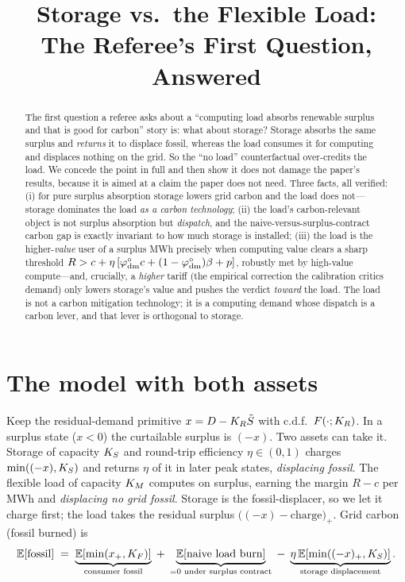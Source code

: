 \title[Storage competes for the same surplus]{Storage vs.\ the Flexible Load:\\
The Referee's First Question, Answered}


\begin{abstract}
The first question a referee asks about a ``computing load absorbs renewable surplus and that
is good for carbon'' story is: what about storage? Storage absorbs the same surplus and
\emph{returns} it to displace fossil, whereas the load consumes it for computing and displaces
nothing on the grid. So the ``no load'' counterfactual over-credits the load. We concede the
point in full and then show it does not damage the paper's results, because it is aimed at a
claim the paper does not need. Three facts, all verified: (i) for pure surplus absorption
storage lowers grid carbon and the load does not---storage dominates the load \emph{as a
carbon technology}; (ii) the load's carbon-relevant object is not surplus absorption but
\emph{dispatch}, and the naive-versus-surplus-contract carbon gap is exactly invariant to how
much storage is installed; (iii) the load is the higher-\emph{value} user of a surplus MWh
precisely when computing value clears a sharp threshold $R>c+\eta\,[\varphi^{\circ}_{\mathrm{dm}}c+(1-\varphi^{\circ}_{\mathrm{dm}})\beta+p]$,
robustly met by high-value compute---and, crucially, a \emph{higher} tariff (the empirical
correction the calibration critics demand) only lowers storage's value and pushes the verdict
\emph{toward} the load. The load is not a carbon mitigation technology; it is a computing
demand whose dispatch is a carbon lever, and that lever is orthogonal to storage.
\end{abstract}


\section{The model with both assets}
Keep the residual-demand primitive $x=D-K_R\tilde S$ with c.d.f.\ $F(\cdot;K_R)$. In a surplus
state ($x<0$) the curtailable surplus is $(-x)$. Two assets can take it. Storage of capacity
$K_S$ and round-trip efficiency $\eta\in(0,1)$ charges $\min((-x),K_S)$ and returns $\eta$ of
it in later peak states, \emph{displacing fossil}. The flexible load of capacity $K_M$
computes on surplus, earning the margin $R-c$ per MWh and \emph{displacing no grid fossil}.
Storage is the fossil-displacer, so we let it charge first; the load takes the residual
surplus $\big((-x)-\text{charge}\big)_+$. Grid carbon (fossil burned) is
\begin{equation}\label{st-eq:carbon}
  \mathbb{E}[\text{fossil}] \;=\; \underbrace{\mathbb{E}[\min(x_+,K_F)]}_{\text{consumer fossil}}
  \;+\;\underbrace{\mathbb{E}[\text{naive load burn}]}_{=0\text{ under surplus contract}}
  \;-\;\underbrace{\eta\,\mathbb{E}[\min((-x)_+,K_S)]}_{\text{storage displacement}} .
\end{equation}

